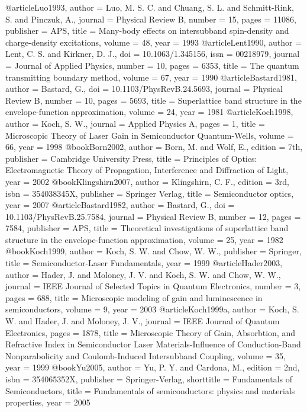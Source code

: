 @article{Luo1993,
author = {Luo, M. S. C. and Chuang, S. L. and Schmitt-Rink, S. and Pinczuk, A.},
journal = {Physical Review B},
number = {15},
pages = {11086},
publisher = {APS},
title = {{Many-body effects on intersubband spin-density and charge-density excitations}},
volume = {48},
year = {1993}
}
@article{Lent1990,
author = {Lent, C. S. and Kirkner, D. J.},
doi = {10.1063/1.345156},
issn = {00218979},
journal = {Journal of Applied Physics},
number = {10},
pages = {6353},
title = {{The quantum transmitting boundary method}},
volume = {67},
year = {1990}
}
@article{Bastard1981,
author = {Bastard, G.},
doi = {10.1103/PhysRevB.24.5693},
journal = {Physical Review B},
number = {10},
pages = {5693},
title = {{Superlattice band structure in the envelope-function approximation}},
volume = {24},
year = {1981}
}
@article{Koch1998,
author = {Koch, S. W.},
journal = {Applied Physics A},
pages = {1},
title = {{Microscopic Theory of Laser Gain in Semiconductor Quantum-Wells}},
volume = {66},
year = {1998}
}
@book{Born2002,
author = {Born, M. and Wolf, E.},
edition = {7th},
publisher = {Cambridge University Press},
title = {{Principles of Optics: Electromagnetic Theory of Propagation, Interference and Diffraction of Light}},
year = {2002}
}
@book{Klingshirn2007,
author = {Klingshirn, C. F.},
edition = {3rd},
isbn = {354038345X},
publisher = {Springer Verlag},
title = {{Semiconductor optics}},
year = {2007}
}
@article{Bastard1982,
author = {Bastard, G.},
doi = {10.1103/PhysRevB.25.7584},
journal = {Physical Review B},
number = {12},
pages = {7584},
publisher = {APS},
title = {{Theoretical investigations of superlattice band structure in the envelope-function approximation}},
volume = {25},
year = {1982}
}
@book{Koch1999,
author = {Koch, S. W. and Chow, W. W.},
publisher = {Springer},
title = {{Semiconductor-Laser Fundamentals}},
year = {1999}
}
@article{Hader2003,
author = {Hader, J. and Moloney, J. V. and Koch, S. W. and Chow, W. W.},
journal = {IEEE Journal of Selected Topics in Quantum Electronics},
number = {3},
pages = {688},
title = {{Microscopic modeling of gain and luminescence in semiconductors}},
volume = {9},
year = {2003}
}
@article{Koch1999a,
author = {Koch, S. W. and Hader, J. and Moloney, J. V.},
journal = {IEEE Journal of Quantum Electronics},
pages = {1878},
title = {{Microscopic Theory of Gain, Absorbtion, and Refractive Index in Semiconductor Laser Materials-Influence of Conduction-Band Nonparabolicity and Coulomb-Induced Intersubband Coupling}},
volume = {35},
year = {1999}
}
@book{Yu2005,
author = {Yu, P. Y. and Cardona, M.},
edition = {2nd},
isbn = {354065352X},
publisher = {Springer-Verlag},
shorttitle = {Fundamentals of Semiconductors},
title = {{Fundamentals of semiconductors: physics and materials properties}},
year = {2005}
}
